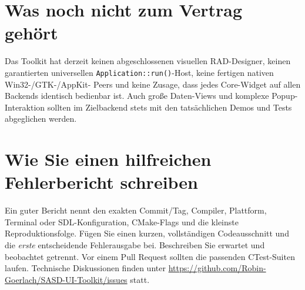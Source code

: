 \section{Was noch nicht zum Vertrag gehört}
Das Toolkit hat derzeit keinen
abgeschlossenen visuellen RAD-Designer,
keinen garantierten universellen
\texttt{Application::run()}-Host,
keine fertigen nativen Win32-/GTK-/AppKit-
Peers und keine Zusage, dass jedes
Core-Widget auf allen Backends
identisch bedienbar ist.
Auch große Daten-Views und
komplexe Popup-Interaktion sollten
im Zielbackend stets mit den
tatsächlichen Demos und Tests
abgeglichen werden.

\section{Wie Sie einen hilfreichen Fehlerbericht schreiben}
Ein guter Bericht nennt den exakten
Commit/Tag, Compiler, Plattform,
Terminal oder SDL-Konfiguration,
CMake-Flags und die kleinste
Reproduktionsfolge. Fügen Sie
einen kurzen, vollständigen
Codeausschnitt und die
\emph{erste} entscheidende
Fehlerausgabe bei.
Beschreiben Sie erwartet und
beobachtet getrennt.
Vor einem Pull Request sollten
die passenden CTest-Suiten laufen.
Technische Diskussionen finden
unter \url{https://github.com/Robin-Goerlach/SASD-UI-Toolkit/issues} statt.

